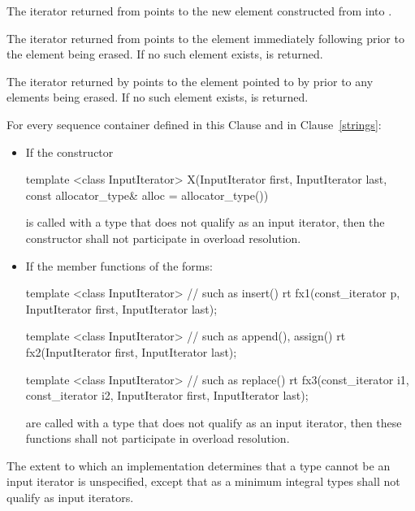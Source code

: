 \pnum
The iterator returned from  points to the new element
constructed from  into .

\pnum
The iterator returned from
points to the element immediately following
prior to the element being erased.
If no such element exists,
is returned.

\pnum
The iterator returned by
points to the element pointed to by
prior to any elements being erased.
If no such element exists,
is returned.

\pnum
For every sequence container defined in this Clause and in Clause~\ref{strings}:

\begin{itemize}
\item If the constructor

\begin{codeblock}
template <class InputIterator>
X(InputIterator first, InputIterator last,
  const allocator_type& alloc = allocator_type())
\end{codeblock}

is called with a type  that does not qualify as an input
iterator, then the constructor
shall not participate in overload resolution.

\item If the member functions of the forms:

\begin{codeblock}
template <class InputIterator>          // such as insert()
  rt fx1(const_iterator p, InputIterator first, InputIterator last);

template <class InputIterator>          // such as append(), assign()
  rt fx2(InputIterator first, InputIterator last);

template <class InputIterator>          // such as replace()
  rt fx3(const_iterator i1, const_iterator i2, InputIterator first, InputIterator last);
\end{codeblock}

are called with a type  that does not qualify as an input
iterator, then these functions
shall not participate in overload resolution.
\end{itemize}

\pnum
The extent to which an implementation determines that a type cannot be an input
iterator is unspecified, except that as a minimum integral types shall not qualify
as input iterators.

